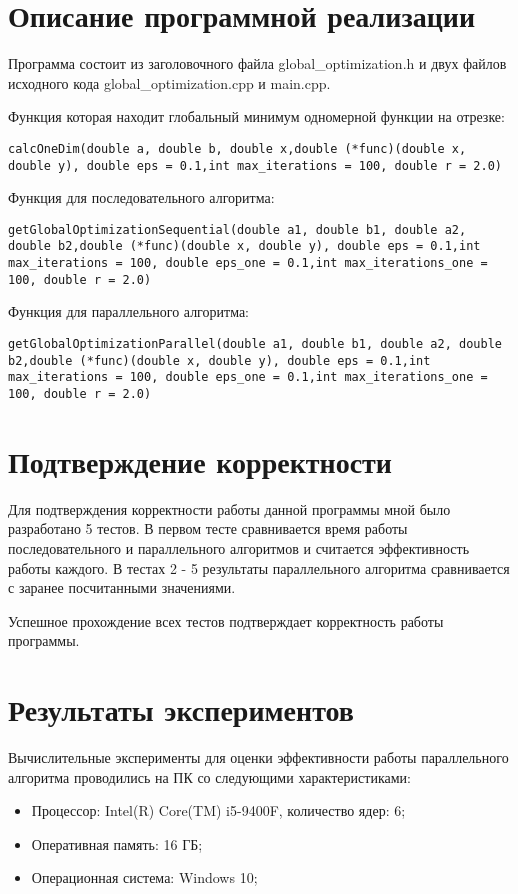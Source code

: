 \documentclass{report}
\begin{document}
\newpage

\section*{Описание программной реализации}
Программа состоит из заголовочного файла global\_optimization.h и двух файлов исходного кода global\_optimization.cpp и main.cpp.
\par Функция которая находит глобальный минимум одномерной функции на отрезке:
\begin{lstlisting}
calcOneDim(double a, double b, double x,double (*func)(double x, double y), double eps = 0.1,int max_iterations = 100, double r = 2.0)
\end{lstlisting}
\par Функция для последовательного алгоритма:
\begin{lstlisting}
getGlobalOptimizationSequential(double a1, double b1, double a2, double b2,double (*func)(double x, double y), double eps = 0.1,int max_iterations = 100, double eps_one = 0.1,int max_iterations_one = 100, double r = 2.0)
\end{lstlisting}
\par Функция для параллельного
алгоритма:
\begin{lstlisting}
getGlobalOptimizationParallel(double a1, double b1, double a2, double b2,double (*func)(double x, double y), double eps = 0.1,int max_iterations = 100, double eps_one = 0.1,int max_iterations_one = 100, double r = 2.0)
\end{lstlisting}

\newpage

\section*{Подтверждение корректности}
Для подтверждения корректности работы данной программы мной было разработано 5 тестов. В первом тесте сравнивается время работы последовательного и параллельного алгоритмов и считается эффективность работы каждого. В тестах 2 - 5 результаты параллельного алгоритма сравнивается с заранее посчитанными значениями.
\par Успешное прохождение всех тестов подтверждает корректность работы программы.
\newpage

\section*{Результаты экспериментов}
Вычислительные эксперименты для оценки эффективности работы параллельного алгоритма проводились на ПК со следующими характеристиками:
\begin{itemize}
\item Процессор: Intel(R) Core(TM) i5-9400F, количество ядер: 6;
\item Оперативная память: 16 ГБ;
\item Операционная система: Windows 10;
\end{itemize}
\end{document}
